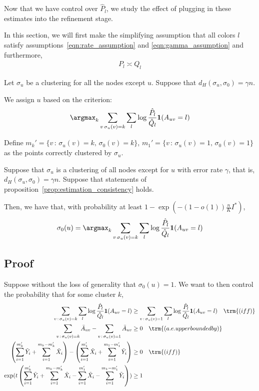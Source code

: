 \documentclass{article}
\begin{document}
Now that we have control over $\hat{P}_l$, we study the effect of plugging in these estimates into the refinement stage.

\begin{shaded}
In this section, we will first make the simplifying assumption that all colors $l$ satisfy assumptions~\ref{eqn:rate_assumption} and \ref{eqn:gamma_assumption} and furthermore, 
\begin{align}
P_l \asymp Q_l \label{eqn:Pl_Ql_equiv}
\end{align}
\end{shaded}



Let $\sigma_u$ be a clustering for all the nodes except $u$. Suppose that $d_H(\sigma_u, \sigma_0) = \gamma n$. 


We assign $u$ based on the criterion:
\[
\argmax_k \sum_{v\, \sigma_u(v)=k} \sum_l \log \frac{\hat{P}_l}{\hat{Q}_l} \mathbf{1}(A_{uv} = l) 
\]

Define $m_k' = \{ v \,:\, \sigma_u(v) = k,\, \sigma_0(v) = k \}$, $m_1' = \{ v \,:\, \sigma_u(v) = 1 ,\, \sigma_0(v) = 1\}$ as the points correctly clustered by $\sigma_u$. 

\begin{shaded}
\begin{proposition}
Suppose that $\sigma_u$ is a clustering of all nodes except for $u$ with error rate $\gamma$, that is, $d_H(\sigma_u, \sigma_0) = \gamma n$. Suppose that statements of proposition~\ref{prop:estimation_consistency} holds. 

Then, we have that, with probability at least $1 - \exp \left( - (1 - o(1)) \frac{n}{K} I^* \right)$, 
\[
\sigma_0(u) = \argmax_k \sum_{v\, \sigma_u(v)=k} \sum_l \log \frac{\hat{P}_l}{\hat{Q}_l} \mathbf{1}(A_{uv} = l) 
\]

\end{proposition}
\end{shaded}

\subsection{Proof}

Suppose without the loss of generality that $\sigma_0(u) = 1$.  We want to then control the probability that for some cluster $k$, 
\begin{align*}
\sum_{v\,:\, \sigma_u(v)=k} \sum_l \log \frac{\hat{P}_l}{\hat{Q}_l} \mathbf{1}(A_{uv} = l) 
&\geq 
 \sum_{v\,:\, \sigma_u(v)=1} \sum_l \log \frac{\hat{P}_l}{\hat{Q}_l} \mathbf{1}(A_{uv} = l) 
  \quad \trm{(iff)} \\
\sum_{v \,:\, \sigma_u(v) = k} \bar{A}_{uv} - \sum_{v\,:\, \sigma_u(v) = 1} \bar{A}_{uv} 
&\geq 0 \quad \trm{(a.e. upper bounded by)} \\
\left( \sum_{i=1}^{m_k'} \tilde{Y}_i + \sum_{i=1}^{m_k - m'_k} \tilde{X}_i \right) - 
\left( \sum_{i=1}^{m_1'} \tilde{X}_i + \sum_{i=1}^{m_1 - m_1'} \tilde{Y}_i  \right) &\geq 0  \quad \trm{(iff)} \\
\exp( t \left( \sum_{i=1}^{m_k'} \tilde{Y}_i + \sum_{i=1}^{m_k - m_k'} \tilde{X}_i - 
     \sum_{i=1}^{m_1'}  \tilde{X}_i - \sum_{i=1}^{m_1 - m_1'} \tilde{Y}_i  \right) ) &\geq 1 
\end{align*}
\end{document}
